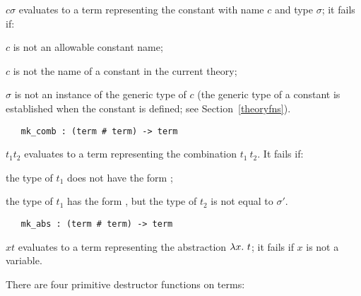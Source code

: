 \noindent{}$c$\ml{,}$\sigma$\ml{)} evaluates to a 
term representing
the constant with name $c$ and type $\sigma$; it fails if:
\begin{myenumerate}
\item $c$ is not an allowable constant name;
\item $c$ is not the name of a constant in the current theory;
\item $\sigma$ is not an instance of the generic type of $c$
(the generic type of a constant is established when the constant is defined;
see Section~\ref{theoryfns}).
\end{myenumerate}

\begin{boxed}
\begin{verbatim}
   mk_comb : (term # term) -> term
\end{verbatim}\end{boxed}

\noindent{}$t_1$\ml{,}$t_2$\ml{)} evaluates to a term 
representing the combination
$t_1\ t_2$. It fails if:
\begin{myenumerate}
\item the type of $t_1$ does not have the form ;
\item the type of $t_1$ has the form , but the
type of $t_2$ is not equal to $\sigma'$.
\end{myenumerate}

\begin{boxed}
\begin{verbatim}
   mk_abs : (term # term) -> term
\end{verbatim}\end{boxed}

\noindent{}$x$\ml{,}$t$\ml{)} evaluates to a term representing
the abstraction $\lambda x.\ t$; it fails if $x$ is not a variable.


There are four primitive destructor functions on terms:

